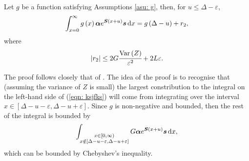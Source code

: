 \begin{lem}\label{lemma:bound}
	Let \(g\) be a function satisfying Assumptions \ref{asu: g}, then, for \(u \leq \Delta - \varepsilon\), 
	\begin{align}
		\int_{x=0}^\infty g\left(x\right)\boldsymbol \alpha e^{\boldsymbol{S}\left(x+u\right)} \boldsymbol s \, \mathrm{d} x = g\left(\Delta-u\right) + r_2,\label{eqn: ksjfks}
	\end{align}
	where 
	\[\left|r_2\right|\leq 2G\cfrac{\mathrm{Var} \left(Z\right)}{\varepsilon^2} + 2L\varepsilon.\]
\end{lem}
The proof follows closely that of \cite[Appendix A, Theorem 4]{hht2020}. The idea of the proof is to recognise that (assuming the variance of \(Z\) is small) the largest constribution to the integral on the left-hand side of (\ref{eqn: ksjfks}) will come from integrating over the interval \(x\in[\Delta-u-\varepsilon,\Delta-u+\varepsilon]\). Since \(g\) is non-negative and bounded, then the rest of the integral is bounded by 
\[\int_{\substack{x\in[0,\infty)\\x\notin[\Delta-u-\varepsilon,\Delta-u+\varepsilon]}} G\boldsymbol \alpha e^{\boldsymbol{S}\left(x+u\right)} \boldsymbol s \, \mathrm{d} x,\]
which can be bounded by Chebyshev's inequality. 
